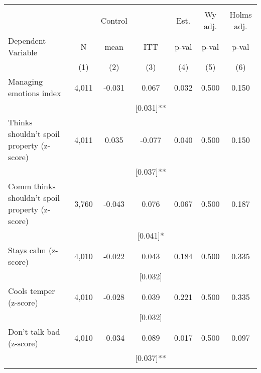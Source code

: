 \begin{tabular}{lcccccc}
\hline \noalign{\smallskip} &  &  &  &  &  & \\
 &  & Control &  & Est. & Wy adj. & Holms adj.\\
Dependent Variable & N & mean & ITT & p-val & p-val & p-val\\
 & (1) & (2) & (3) & (4) & (5) & (6)\\
\noalign{\smallskip}\hline \noalign{\smallskip}Managing emotions index & 4,011 & -0.031 & 0.067 & 0.032 & 0.500 & 0.150\\
 &  &  & [0.031]** &  &  & \\
\quad Thinks shouldn't spoil property (z-score) & 4,011 & 0.035 & -0.077 & 0.040 & 0.500 & 0.150\\
 &  &  & [0.037]** &  &  & \\
\quad Comm thinks shouldn't spoil property (z-score) & 3,760 & -0.043 & 0.076 & 0.067 & 0.500 & 0.187\\
 &  &  & [0.041]* &  &  & \\
\quad Stays calm (z-score) & 4,010 & -0.022 & 0.043 & 0.184 & 0.500 & 0.335\\
 &  &  & [0.032] &  &  & \\
\quad Cools temper (z-score) & 4,010 & -0.028 & 0.039 & 0.221 & 0.500 & 0.335\\
 &  &  & [0.032] &  &  & \\
\quad Don't talk bad (z-score) & 4,010 & -0.034 & 0.089 & 0.017 & 0.500 & 0.097\\
 &  &  & [0.037]** &  &  & \\
\noalign{\smallskip}\hline\end{tabular}

